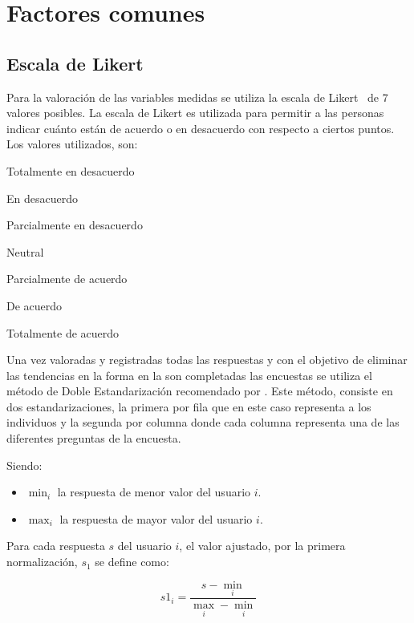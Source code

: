 
\section{Factores comunes}

\subsection{Escala de Likert}
\label{sec:likert}

Para la valoración de las variables medidas se utiliza la escala de
Likert~\cite{Allen:2007} de 7 valores posibles. La escala de Likert es utilizada
para permitir a las personas indicar cuánto están de acuerdo o en desacuerdo con
respecto a ciertos puntos. Los valores utilizados, son:

\begin{enumerate*}
    \item Totalmente en desacuerdo
    \item En desacuerdo
    \item Parcialmente en desacuerdo
    \item Neutral
    \item Parcialmente de acuerdo
    \item De acuerdo
    \item Totalmente de acuerdo
\end{enumerate*}

Una vez valoradas y registradas todas las respuestas y con el objetivo de
eliminar las tendencias en la forma en la son completadas las encuestas
\cite{Fischer2010} se utiliza el método de Doble Estandarización recomendado por
\cite{Pagolu2011}. Este método, consiste en dos estandarizaciones, la primera
por fila que en este caso representa a los individuos y la segunda por columna
donde cada columna representa una de las diferentes preguntas de la encuesta.

Siendo:
\begin{itemize}
	\item $\min_i$ la respuesta de menor valor del usuario $i$.
	\item $\max_i$ la respuesta de mayor valor del usuario $i$.
\end{itemize}

Para cada respuesta $s$ del usuario $i$, el valor ajustado, por la primera 
normalización, $s_1$ se define como:

\begin{equation*}
s1_i=\frac{s-\min_i}{\max_i-\min_i}
\end{equation*}

